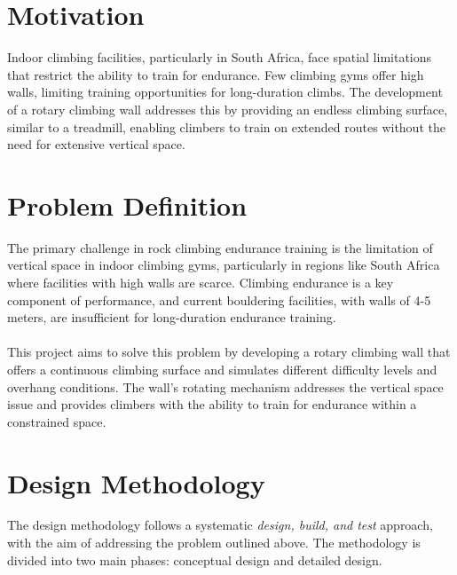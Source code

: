 \section{Motivation}
Indoor climbing facilities, particularly in South Africa, face spatial limitations that restrict the ability to train for endurance. Few climbing gyms offer high walls, limiting training opportunities for long-duration climbs. The development of a rotary climbing wall addresses this by providing an endless climbing surface, similar to a treadmill, enabling climbers to train on extended routes without the need for extensive vertical space.

\section{Problem Definition}
The primary challenge in rock climbing endurance training is the limitation of vertical space in indoor climbing gyms, particularly in regions like South Africa where facilities with high walls are scarce. Climbing endurance is a key component of performance, and current bouldering facilities, with walls of 4-5 meters, are insufficient for long-duration endurance training. \\\\
This project aims to solve this problem by developing a rotary climbing wall that offers a continuous climbing surface and simulates different difficulty levels and overhang conditions. The wall's rotating mechanism addresses the vertical space issue and provides climbers with the ability to train for endurance within a constrained space.

\section{Design Methodology}
The design methodology follows a systematic \textit{design, build, and test} approach, with the aim of addressing the problem outlined above. The methodology is divided into two main phases: conceptual design and detailed design.

